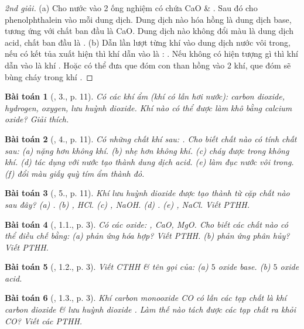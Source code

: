 \documentclass{article}
\newtheorem{baitoan}{Bài toán}
\begin{document}
\begin{proof}[2nd giải]
	(a) Cho nước vào 2 ống nghiệm có chứa CaO \& . Sau đó cho phenolphthalein vào mỗi dung dịch. Dung dịch nào hóa hồng là dung dịch base, tương ứng với chất ban đầu là CaO. Dung dịch nào không đổi màu là dung dịch acid, chất ban đầu là . (b) Dẫn lần lượt từng khí vào dung dịch nước vôi trong, nếu có kết tủa xuất hiện thì khí dẫn vào là : . Nếu không có hiện tượng gì thì khí dẫn vào là khí . Hoặc có thể đưa que đóm con than hồng vào 2 khí, que đóm sẽ bùng cháy trong khí .
\end{proof}

\begin{baitoan}[\cite{SGK_Hoa_Hoc_9}, 3., p. 11]
	Có các khí ẩm (khí có lẫn hơi nước): carbon dioxide, hydrogen, oxygen, lưu huỳnh dioxide. Khí nào có thể được làm khô bằng calcium oxide? Giải thích.
\end{baitoan}

\begin{baitoan}[\cite{SGK_Hoa_Hoc_9}, 4., p. 11]
	Có những chất khí sau: \emph{}. Cho biết chất nào có tính chất sau: (a) nặng hơn không khí. (b) nhẹ hơn không khí. (c) cháy được trong không khí. (d) tác dụng với nước tạo thành dung dịch acid. (e) làm đục nước vôi trong. (f) đổi màu giấy quỳ tím ẩm thành đỏ.
\end{baitoan}

\begin{baitoan}[\cite{SGK_Hoa_Hoc_9}, 5., p. 11]
	Khí lưu huỳnh dioxide được tạo thành từ cặp chất nào sau đây? (a) \emph{}. (b) \emph{, HCl}. (c) \emph{, NaOH}. (d) \emph{}. (e) \emph{, NaCl}. Viết PTHH.
\end{baitoan}

\begin{baitoan}[\cite{SBT_Hoa_Hoc_9}, 1.1., p. 3]
	Có các oxide: \emph{, CaO, MgO}. Cho biết các chất nào có thể điều chế bằng: (a) phản ứng hóa hợp? Viết PTHH. (b) phản ứng phân hủy? Viết PTHH.
\end{baitoan}

\begin{baitoan}[\cite{SBT_Hoa_Hoc_9}, 1.2., p. 3]
	Viết CTHH \& tên gọi của: (a) $5$ oxide base. (b) $5$ oxide acid.
\end{baitoan}

\begin{baitoan}[\cite{SBT_Hoa_Hoc_9}, 1.3., p. 3]
	Khí carbon monooxide \emph{CO} có lẫn các tạp chất là khí carbon dioxide \emph{} \& lưu huỳnh dioxide \emph{}. Làm thế nào tách được các tạp chất ra khỏi \emph{CO}? Viết các PTHH.
\end{baitoan}
\end{document}
